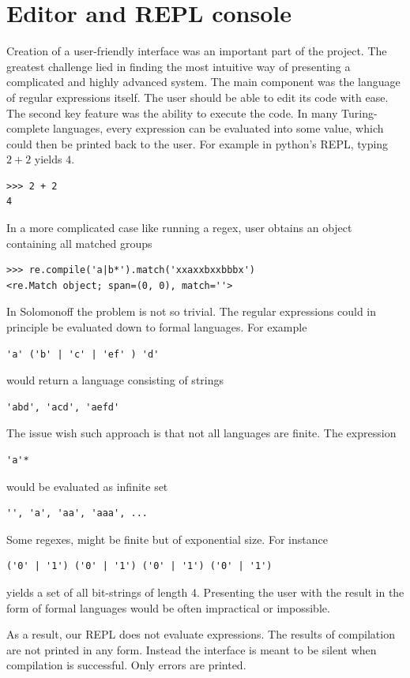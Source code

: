 
\section{Editor and REPL console}

Creation of a user-friendly interface was an important part of the project.
The greatest challenge lied in finding the most intuitive way of presenting a complicated and highly advanced system. The main component was the language of regular expressions itself. The user should be able to edit its code with ease. The second key feature was the ability to execute the code. 
In many Turing-complete languages, every expression can be evaluated into some value, which could then be printed back to the user. For example in python's REPL, typing $2+2$ yields $4$.
\begin{lstlisting}
>>> 2 + 2
4
\end{lstlisting}
In a more complicated case like running a regex, user obtains an object containing all matched groups
\begin{lstlisting}
>>> re.compile('a|b*').match('xxaxxbxxbbbx')
<re.Match object; span=(0, 0), match=''>
\end{lstlisting}
In Solomonoff the problem is not so trivial. The regular expressions could in principle be evaluated down to formal languages. For example 
\begin{lstlisting}
'a' ('b' | 'c' | 'ef' ) 'd'
\end{lstlisting}
would return a language consisting of strings
\begin{lstlisting}
'abd', 'acd', 'aefd'
\end{lstlisting}
The issue wish such approach is that not all languages are finite. The expression
\begin{lstlisting}
'a'*
\end{lstlisting}
would be evaluated as infinite set
\begin{lstlisting}
'', 'a', 'aa', 'aaa', ...
\end{lstlisting}
Some regexes, might be finite but of exponential size. For instance
\begin{lstlisting}
('0' | '1') ('0' | '1') ('0' | '1') ('0' | '1')
\end{lstlisting}
yields a set of all bit-strings of length 4. Presenting the user with the result in the form of formal languages would be often impractical or impossible. 

As a result, our REPL does not evaluate expressions. The results of compilation are not printed in any form. Instead the interface is meant to be silent when compilation is successful. Only errors are printed. 

